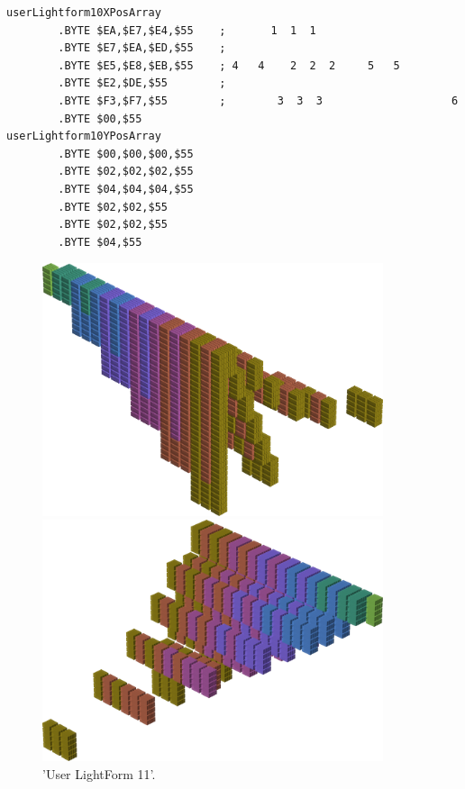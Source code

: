 \begin{lstlisting}
userLightform10XPosArray
        .BYTE $EA,$E7,$E4,$55    ;       1  1  1                      
        .BYTE $E7,$EA,$ED,$55    ;                                    
        .BYTE $E5,$E8,$EB,$55    ; 4   4    2  2  2     5   5         
        .BYTE $E2,$DE,$55        ;                                    
        .BYTE $F3,$F7,$55        ;        3  3  3                    6
        .BYTE $00,$55
userLightform10YPosArray
        .BYTE $00,$00,$00,$55
        .BYTE $02,$02,$02,$55
        .BYTE $04,$04,$04,$55
        .BYTE $02,$02,$55
        .BYTE $02,$02,$55
        .BYTE $04,$55
\end{lstlisting}


\begin{figure}[H]
    \centering
    \begin{adjustbox}{width=10cm,center}
      \includegraphics[width=10cm]{src/colorspace_patterns/pattern19-45.png}%
    \end{adjustbox}
    \begin{adjustbox}{width=10cm}
      \includegraphics[width=10cm]{src/colorspace_patterns/pattern19-225.png}%
    \end{adjustbox}
\caption{'User LightForm 11'.}
\end{figure}
\clearpage

